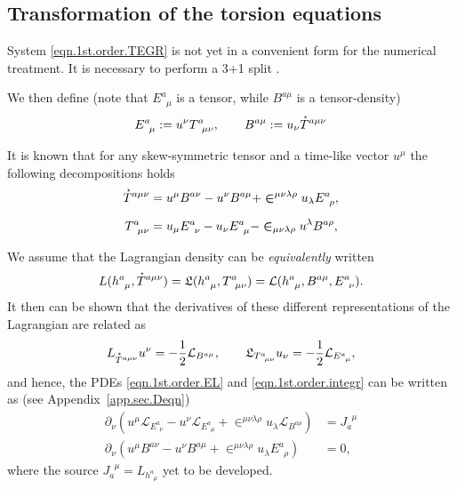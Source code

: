 \documentclass[
10pt, %
a4paper, %
oneside, %
headinclude,footinclude, %
BCOR5mm, %
]{scrartcl}
\newcommand{\tetrsymbol}{h}
\newcommand{\tetr}[2]{\tetrsymbol^{#1}_{\phantom{#1}#2}}
\newcommand{\D}[1]{\partial_{#1}} %
\newcommand{\Tors}[2]{T^{#1}_{\phantom{a}#2}}
\newcommand{\ET}[2]{E^{#1}_{\phantom{#1}#2}}	%
\newcommand{\BT}[2]{B^{#1#2}}	%
\newcommand{\Laghodge}{L}%
\newcommand{\Lagtors}{\mathfrak{L}}%
\newcommand{\LagBE}{\mathcal{L}}%
\newcommand{\LCsymb}{\bm{\in}}    %
\newcommand{\HDT}[1]{\accentset{\star}{T}^{#1}}
\newcommand{\NC}[2]{J^{\phantom{#1}#2}_{#1}}
\begin{document}
\subsection{Transformation of the torsion equations}\label{sec.transform.potential}


System \eqref{eqn.1st.order.TEGR} is not yet in a convenient form for the numerical treatment. It 
is necessary to perform a 3+1 split \cite{Alcubierre2008}. 


We then define (note that $ \ET{a}{\mu} $ is a tensor, while $ \BT{a}{\mu} $ is a tensor-density)
\begin{equation}
\ET{a}{\mu} := u^\nu \Tors{a}{\mu\nu}, \qquad  \BT{a}{\mu} := u_\nu\HDT{a\mu\nu}
\end{equation}


It is known that for any skew-symmetric tensor and a time-like vector $ u^\mu $ the following 
decompositions holds
\begin{subequations}\label{eqn.T.decompos}
\begin{align}
\HDT{a\mu\nu} &= u^\mu \BT{a}{\nu} - u^\nu \BT{a}{\mu} + 
\LCsymb^{\mu\nu\lambda\rho}u_\lambda 
\ET{a}{\rho},\\[2mm]
\Tors{a}{\mu\nu} &= u_\mu \ET{a}{\nu} - u_\nu \ET{a}{\mu} - 
\LCsymb_{\mu\nu\lambda\rho}u^\lambda 
\BT{a}{\rho},
\end{align}
\end{subequations}

We assume that the Lagrangian density can be \textit{equivalently} written 
\begin{equation}\label{eqn.Lagrangians2}
\Laghodge(\tetr{a}{\mu},\HDT{a\mu\nu}) = \Lagtors(\tetr{a}{\mu},\Tors{a}{\mu\nu}) = 
\LagBE(\tetr{a}{\mu},\BT{a}{\mu},\ET{a}{\nu}).
\end{equation}
It then can be shown that the derivatives of these different representations of the Lagrangian are related as
\begin{equation}
\Laghodge_{\HDT{a\mu\nu}}u^\nu = -\frac12\LagBE_{\BT{a}{\mu}}, 
\qquad 
\Lagtors_{\Tors{a}{\mu\nu}}u_\nu = -\frac12\LagBE_{\ET{a}{\mu}},
\end{equation}
and hence, the PDEs \eqref{eqn.1st.order.EL} and \eqref{eqn.1st.order.integr} 
can be written as (see Appendix~\eqref{app.sec.Deqn})
\begin{subequations}\label{eqn.tors.BE}
	\begin{align}
		\D{\nu}( u^\mu\LagBE_{\ET{a}{\nu}} - u^\nu \LagBE_{\ET{a}{\mu}} + 
		\LCsymb^{\mu\nu\lambda\rho}u_\lambda\LagBE_{\BT{a}{\rho}}) 
		&= \NC{a}{\mu}\label{eqn.tors.BE.a} \\[2mm]
%		
		\D{\nu}(u^\mu \BT{a}{\nu} - u^\nu\BT{a}{\mu} + 
		\LCsymb^{\mu\nu\lambda\rho}u_\lambda\ET{a}{\rho}) &= 0,
	\end{align}
\end{subequations}
where the source $ \NC{a}{\mu} = \Laghodge_{\tetr{a}{\mu}} $ yet to be developed.
\end{document}
